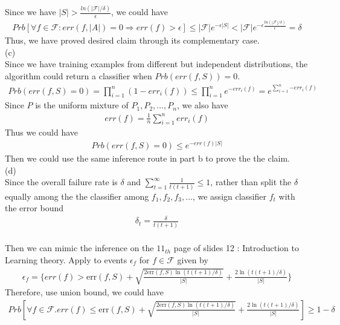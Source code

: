 \documentclass[twoside,11pt]{homework}
\begin{document}
Since we have $|S| > \frac{ln(|\mathcal{F}|/\delta)}{\epsilon}$, we could have\\
\begin{align*}
Prb[\forall f \in  \mathcal{F}: err(f,|A|) = 0 \Rightarrow err(f) > \epsilon] \leq |\mathcal{F}|e^{-\epsilon |S|} <  |\mathcal{F}|e^{-\epsilon\frac{ln(|\mathcal{F}|/\delta)}{\epsilon}} = \delta
\end{align*}
Thus, we have proved desired claim through its complementary case. 
\\

(c) \indent \\ \indent
Since we have training examples from different but independent distributions, the algorithm could return a classifier when $Prb(err(f, S)) = 0$. \\
\begin{align*}
Prb(err(f, S) = 0) = \prod_{i=1}^{n}{(1-err_i(f))} \leq \prod_{i=1}^{n}e^{-err_i(f)} = e^{\sum_{i=1}^{n}{-err_i(f)}}
\end{align*}
Since $P$ is the uniform mixture of $P_1, P_2, ..., P_n$, we also have \\
\begin{align*}
err(f) = \frac{1}{n} {\sum_{i=1}^{n}{err_i(f)}}
\end{align*}
Thus we could have 
\begin{align*}
Prb(err(f, S) = 0) \leq e^{-err(f)|S|}
\end{align*}
Then we could use the same inference route in part b to prove the the claim. 
\\
(d) \indent \\ \indent
Since the overall failure rate is $\delta$ and $\sum_{t=1}^{\infty}\frac{1}{t(t+1)} \leq 1$, rather than split the $\delta$ equally among the the classifier among $f_1, f_2, f_3, ...$, we assign classifier $f_t$ with the error bound\\
\begin{align*}
\delta_{t}= \frac {\delta}{t(t+1)}
\end{align*}
\\
Then we can mimic the inference on the $11_{th}$ page of slides 12 : Introduction to Learning theory.
Apply to events $\epsilon_f$ for $f \in \mathcal{F}$ given by 
\begin{align*}
\epsilon_f = \{err(f) > \mbox{err}(f,S) + \sqrt{\frac{2\mbox{err}(f,S)\ln(t(t+1)/\delta)}{|S|}} + \frac{2\ln(t(t+1)/\delta)}{|S|} \}
\end{align*}
Therefore, use union bound, we could have
\begin{align*}
Prb[\forall f \in  \mathcal{F} .err(f) \leq \mbox{err}(f,S) + \sqrt{\frac{2\mbox{err}(f,S)\ln(t(t+1)/\delta)}{|S|}} + \frac{2\ln(t(t+1)/\delta)}{|S|} ] \geq 1 - \delta
\end{align*}
\end{document}
